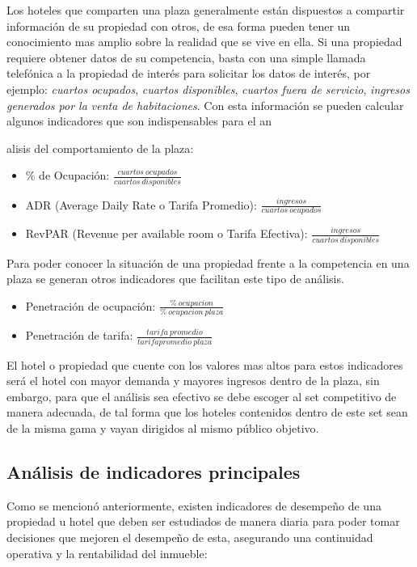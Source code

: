 Los hoteles que comparten una plaza generalmente están dispuestos a compartir información de su propiedad con otros, de esa forma pueden tener un conocimiento mas amplio sobre la realidad que se vive en ella. Si una propiedad requiere obtener datos de su competencia, basta con una simple llamada telefónica a la propiedad de interés para solicitar los datos de interés, por ejemplo: \emph{cuartos ocupados}, \emph{cuartos disponibles}, \emph{cuartos fuera de servicio}, \emph{ingresos generados por la venta de habitaciones}. Con esta información se pueden calcular algunos indicadores que son indispensables para el an{alisis del comportamiento de la plaza:
\begin{itemize}
  \item \% de Ocupación: $\frac{cuartos\ ocupados}{cuartos\ disponibles}$
  \item ADR (Average Daily Rate o Tarifa Promedio): $\frac{ingresos}{cuartos\ ocupados}$
  \item RevPAR (Revenue per available room o Tarifa Efectiva): $\frac{ingresos}{cuartos\ disponibles}$
\end{itemize}

Para poder conocer la situación de una propiedad frente a la competencia en una plaza se generan otros indicadores que facilitan este tipo de análisis.

\begin{itemize}
  \item Penetración de ocupación: $\frac{\%\ ocupacion}{\%\ ocupacion\ plaza}$
  \item Penetración de tarifa: $\frac{tarifa\ promedio}{tarifa promedio\ plaza}$
\end{itemize}

El hotel o propiedad que cuente con los valores mas altos para estos indicadores será el hotel con mayor demanda y mayores ingresos dentro de la plaza, sin embargo, para que el análisis sea efectivo se debe escoger al set competitivo de manera adecuada, de tal forma que los hoteles contenidos dentro de este set sean de la misma gama y vayan dirigidos al mismo público objetivo.


\subsection*{Análisis de indicadores principales}

Como se mencionó anteriormente, existen indicadores de desempeño de una propiedad u hotel que deben ser estudiados de manera diaria para poder tomar decisiones que mejoren el desempeño de esta, asegurando una continuidad operativa y la rentabilidad del inmueble:

}

